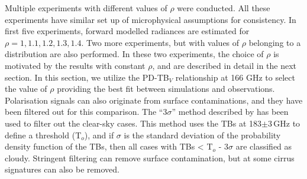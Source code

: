\documentclass[amt, manuscript]{copernicus}
\begin{document}
Multiple experiments with different values of $\rho$ were conducted. All these experiments have similar set up of microphysical assumptions for consistency. In first five experiments, forward modelled radiances are estimated for $\rho = 1,1.1, 1.2, 1.3, 1.4$. Two more experiments, but with values of $\rho$ belonging to a distribution are also performed. In these two experiments, the choice of $\rho$ is motivated by the results with constant $\rho$, and are described in detail in the next section.  In this section, we utilize the PD-TB$_V$ relationship at 166\,\,GHz to select the value of $\rho$ providing the best fit between simulations and observations. Polarisation signals can also originate from surface contaminations, and they have been filtered out for this comparison.  The  ``3$\sigma$'' method described by \citet{gong:micro:17} has been used to filter out the clear-sky cases. This method uses the TBs at 183$\pm$3\,GHz to define a threshold (T$_o$), and if  $\sigma$ is the standard deviation of the probability density function of the TBs, then all cases with TBs < T$_o$ - 3$\sigma$ are classified as cloudy. Stringent filtering can remove surface contamination, but at some cirrus signatures can also be removed. 


\end{document}
